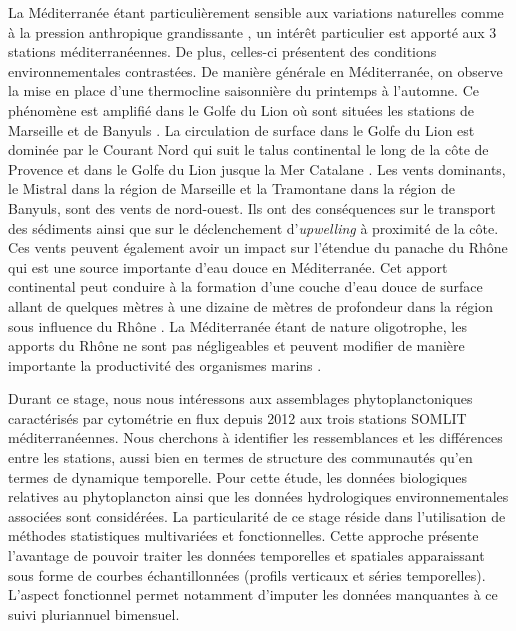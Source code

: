 \documentclass[12pt]{article}
\begin{document}
La Méditerranée étant particulièrement sensible aux variations naturelles comme à la pression anthropique grandissante \citep{Durrieu2011}, un intérêt particulier est apporté aux 3 stations méditer\-ranéen\-nes. De plus, celles-ci présentent des conditions environnementales contrastées. De manière générale en Méditerranée, on observe la mise en place d’une thermocline saisonnière du printemps à l’automne. Ce phénomène est amplifié dans le Golfe du Lion où sont situées les stations de Marseille et de Banyuls \citep{Millot1990}. La circulation de surface dans le Golfe du Lion est dominée par le Courant Nord qui suit le talus continental le long de la côte de Provence et dans le Golfe du Lion jusque la Mer Catalane \citep{Millot1990}. Les vents dominants, le Mistral dans la région de Marseille et la Tramontane dans la région de Banyuls, sont des vents de nord-ouest.  Ils ont des conséquences sur le transport des sédiments ainsi que sur le déclenchement d’\textit{upwelling} à proximité de la côte. Ces vents peuvent également avoir un impact sur l’étendue du panache du Rhône qui est une source importante d’eau douce en Méditerranée. Cet apport continental peut conduire à la formation d’une couche d’eau douce de surface allant de quelques mètres à une dizaine de mètres de profondeur dans la région sous influence du Rhône \citep{Pairaud2011}. La Méditerranée étant de nature oligotrophe, les apports du Rhône ne sont pas négligeables et peuvent modifier de manière importante la productivité des organismes marins \citep{Pairaud2011}. 

Durant ce stage, nous nous intéressons aux assemblages phytoplanctoniques caractérisés par cytométrie en flux depuis 2012 aux trois stations SOMLIT méditerranéennes. Nous cherchons à identifier les ressemblances et les différences entre les stations, aussi bien en termes de structure des communautés qu’en termes de dynamique temporelle. Pour cette étude, les données biologiques relatives au phytoplancton ainsi que les données hydrologiques environnementales associées sont considérées. La particularité de ce stage réside dans l’utilisation de méthodes statistiques multivariées et fonctionnelles. Cette approche présente l’avantage de pouvoir traiter les données temporelles et spatiales apparaissant sous forme de courbes échantillonnées (profils verticaux et séries temporelles). L’aspect fonctionnel permet notamment d’imputer les données manquantes à ce suivi pluriannuel bimensuel. 
\end{document}
